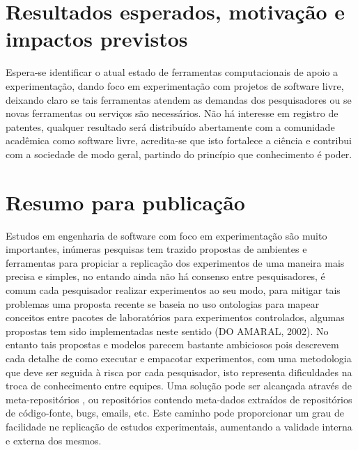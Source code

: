 \documentclass[12pt]{article}
\begin{document}
\section{Resultados esperados, motivação e impactos previstos}

Espera-se identificar o atual estado de ferramentas computacionais de apoio a
experimentação, dando foco em experimentação com projetos de software livre,
deixando claro se tais ferramentas atendem as demandas dos pesquisadores ou se
novas ferramentas ou serviços são necessários. Não há interesse em registro de
patentes, qualquer resultado será distribuído abertamente com a comunidade
acadêmica como software livre, acredita-se que isto fortalece a ciência e
contribui com a sociedade de modo geral, partindo do princípio que
conhecimento é poder.

\section{Resumo para publicação}

Estudos em engenharia de software com foco em experimentação são muito
importantes\cite{theRoleOfExperimentation}, inúmeras pesquisas tem trazido
propostas de ambientes e ferramentas para propiciar a replicação dos
experimentos \cite{towardsAComputerizedInfrastructure} de uma maneira mais
precisa e simples, no entando ainda não há consenso entre pesquisadores, é
comum cada pesquisador realizar experimentos ao seu modo, para mitigar tais
problemas uma proposta recente se baseia no uso ontologias
\cite{knowledgeSharingIssues} para mapear conceitos entre pacotes de
laboratórios para experimentos controlados, algumas propostas tem sido
implementadas neste sentido (DO AMARAL, 2002). No entanto tais propostas e
modelos parecem bastante ambiciosos pois descrevem cada detalhe de como
executar e empacotar experimentos, com uma metodologia que deve ser seguida à
risca por cada pesquisador, isto representa dificuldades
\cite{knowledgeSharingIssues} na troca de conhecimento entre equipes. Uma
solução pode ser alcançada através de meta-repositórios
\cite{usingRepositoryOfRepositories}, ou repositórios contendo meta-dados
extraídos de repositórios de código-fonte, bugs, emails, etc. Este caminho
\cite{flossmoleACollaborativeRepository} pode proporcionar um grau de
facilidade ne replicação de estudos experimentais, aumentando a validade
interna e externa dos mesmos.


\end{document}
